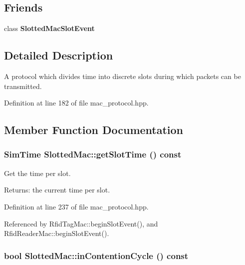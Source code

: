 \subsection*{Friends}
\begin{CompactItemize}
\item 
class \bf{Slotted\-Mac\-Slot\-Event}\label{classSlottedMac_6df6ba29e30155ace27c25f82e099316}

\end{CompactItemize}


\subsection{Detailed Description}
A protocol which divides time into discrete slots during which packets can be transmitted. 



Definition at line 182 of file mac\_\-protocol.hpp.

\subsection{Member Function Documentation}
\subsubsection{\setlength{\rightskip}{0pt plus 5cm}\bf{Sim\-Time} Slotted\-Mac::get\-Slot\-Time () const\hspace{0.3cm}{\tt  [inline, protected]}}\label{classSlottedMac_eeec78e7a36e51656cdc7c4f8ecdcab5}


Get the time per slot. 

\begin{Desc}
\item[Returns:]the current time per slot. \end{Desc}


Definition at line 237 of file mac\_\-protocol.hpp.

Referenced by Rfid\-Tag\-Mac::begin\-Slot\-Event(), and Rfid\-Reader\-Mac::begin\-Slot\-Event().
\subsubsection{\setlength{\rightskip}{0pt plus 5cm}bool Slotted\-Mac::in\-Contention\-Cycle () const\hspace{0.3cm}{\tt  [inline, protected]}}\label{classSlottedMac_7881edcfa833a795dae7b1bbe21479a1}



